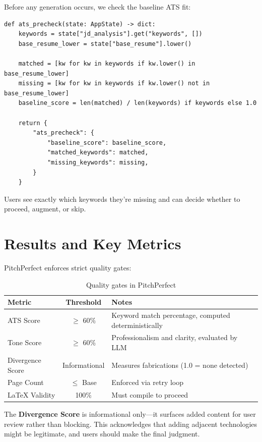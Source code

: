 \documentclass[12pt, a4paper]{article}
\begin{document}
Before any generation occurs, we check the baseline ATS fit:

\begin{verbatim}
def ats_precheck(state: AppState) -> dict:
    keywords = state["jd_analysis"].get("keywords", [])
    base_resume_lower = state["base_resume"].lower()

    matched = [kw for kw in keywords if kw.lower() in base_resume_lower]
    missing = [kw for kw in keywords if kw.lower() not in base_resume_lower]
    baseline_score = len(matched) / len(keywords) if keywords else 1.0

    return {
        "ats_precheck": {
            "baseline_score": baseline_score,
            "matched_keywords": matched,
            "missing_keywords": missing,
        }
    }
\end{verbatim}

Users see exactly which keywords they're missing and can decide whether to proceed, augment, or skip.

\newpage

\section{Results and Key Metrics}

PitchPerfect enforces strict quality gates:

\begin{table}[h]
\centering
\begin{tabular}{|l|c|p{6cm}|}
\hline
\textbf{Metric} & \textbf{Threshold} & \textbf{Notes} \\
\hline
ATS Score & $\geq$ 60\% & Keyword match percentage, computed deterministically \\
\hline
Tone Score & $\geq$ 60\% & Professionalism and clarity, evaluated by LLM \\
\hline
Divergence Score & Informational & Measures fabrications (1.0 = none detected) \\
\hline
Page Count & $\leq$ Base & Enforced via retry loop \\
\hline
LaTeX Validity & 100\% & Must compile to proceed \\
\hline
\end{tabular}
\caption{Quality gates in PitchPerfect}
\end{table}

The \textbf{Divergence Score} is informational only---it surfaces added content for user review rather than blocking. This acknowledges that adding adjacent technologies might be legitimate, and users should make the final judgment.
\end{document}

